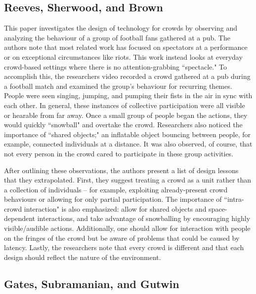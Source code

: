 \subsection{Reeves, Sherwood, and Brown}

This paper investigates the design of technology for crowds by observing and analyzing the behaviour of a group of football fans gathered at a pub. The authors note that most related work has focused on spectators at a performance or on exceptional circumstances like riots. This work instead looks at everyday crowd-based settings where there is no attention-grabbing ``spectacle." To accomplish this, the researchers video recorded a crowd gathered at a pub during a football match and examined the group's behaviour for recurring themes. People were seen singing, jumping, and pumping their fists in the air in sync with each other. In general, these instances of collective participation were all visible or hearable from far away. Once a small group of people began the actions, they would quickly ``snowball" and overtake the crowd. Researchers also noticed the importance of ``shared objects;" an inflatable object bouncing between people, for example, connected individuals at a distance. It was also observed, of course, that not every person in the crowd cared to participate in these group activities.

After outlining these observations, the authors present a list of design lessons that they extrapolated. First, they suggest treating a crowd as a unit rather than a collection of individuals -- for example, exploiting already-present crowd behaviours or allowing for only partial participation. The importance of ``intra-crowd interaction" is also emphasized: allow for shared objects and space-dependent interactions, and take advantage of snowballing by encouraging highly visible/audible actions. Additionally, one should allow for interaction with people on the fringes of the crowd but be aware of problems that could be caused by latency. Lastly, the researchers note that every crowd is different and that each design should reflect the nature of the environment.

\subsection{Gates, Subramanian, and Gutwin}


